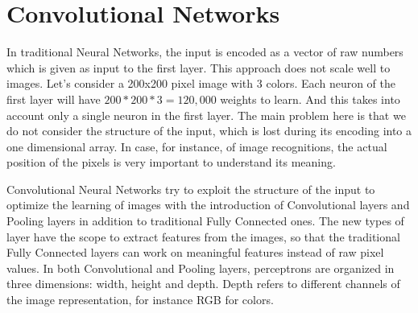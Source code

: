 \section{Convolutional Networks}
\label{sec:conv_net}

In traditional Neural Networks, the input is encoded as a vector of raw numbers which is given as input to the first layer.
This approach does not scale well to images.
Let's consider a 200x200 pixel image with 3 colors.
Each neuron of the first layer will have $200 * 200 * 3 = 120,000$ weights to learn.
And this takes into account only a single neuron in the first layer.
The main problem here is that we do not consider the structure of the input, which is lost during its encoding into a one dimensional array.
In case, for instance, of image recognitions, the actual position of the pixels is very important to understand its meaning.

Convolutional Neural Networks try to exploit the structure of the input to optimize the learning of images with the introduction of Convolutional layers and Pooling layers in addition to traditional Fully Connected ones.
The new types of layer have the scope to extract features from the images, so that the traditional Fully Connected layers can work on meaningful features instead of raw pixel values.
In both Convolutional and Pooling layers, perceptrons are organized in three dimensions: width, height and depth.
Depth refers to different channels of the image representation, for instance RGB for colors.

